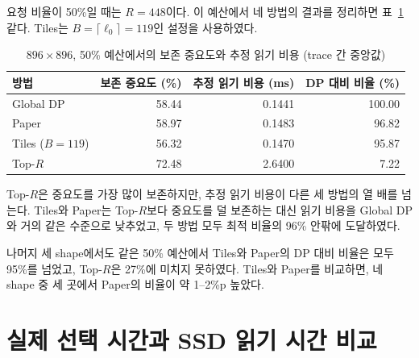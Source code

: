 요청 비율이 50\%일 때는 $R=448$이다. 이 예산에서 네 방법의 결과를 정리하면 표~\ref{tab:model-50}\와 같다. Tiles는 $B=\lceil\ell_0\rceil=119$인 설정을 사용하였다.

\begin{table}[htbp]
    \centering
    \caption{$896\times896$, 50\% 예산에서의 보존 중요도와 추정 읽기 비용 (trace 간 중앙값)}
    \label{tab:model-50}
    \begin{tabular}{lrrr}
        \toprule
        방법 & 보존 중요도 (\%) & 추정 읽기 비용 (ms) & DP 대비 비율 (\%) \\
        \midrule
        Global DP & 58.44 & 0.1441 & 100.00 \\
        Paper & 58.97 & 0.1483 & 96.82 \\
        Tiles ($B=119$) & 56.32 & 0.1470 & 95.87 \\
        Top-$R$ & 72.48 & 2.6400 & 7.22 \\
        \bottomrule
    \end{tabular}
\end{table}

Top-$R$은 중요도를 가장 많이 보존하지만, 추정 읽기 비용이 다른 세 방법의 열 배를 넘는다. Tiles와 Paper는 Top-$R$보다 중요도를 덜 보존하는 대신 읽기 비용을 Global DP와 거의 같은 수준으로 낮추었고, 두 방법 모두 최적 비율의 96\% 안팎에 도달하였다.

나머지 세 shape에서도 같은 50\% 예산에서 Tiles와 Paper의 DP 대비 비율은 모두 95\%를 넘었고, Top-$R$은 27\%에 미치지 못하였다. Tiles와 Paper를 비교하면, 네 shape 중 세 곳에서 Paper의 비율이 약 1--2\%p 높았다.


\section{실제 선택 시간과 SSD 읽기 시간 비교}\label{sec:exp-real}

